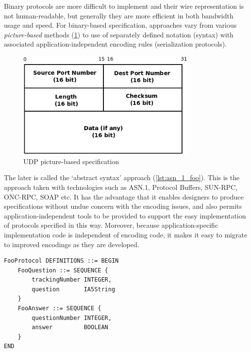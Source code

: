 \documentclass[times, utf8, diplomski]{fer}
\begin{document}
Binary protocols are more difficult to implement and their wire representation 
is not human-readable, but generally they are more efficient in both bandwidth 
usage and speed. For binary-based specification, approaches vary from various 
\emph{picture-based} methods (\ref{fig:udp_picture_spec}) to use of separately defined notation (syntax) with
associated application-independent encoding rules (serialization protocols).

\begin{figure}[htb]
\begin{center}
\leavevmode
\includegraphics[width=0.8\textwidth]{udp_picture_spec}
\end{center}
\caption{UDP picture-based specification}
\label{fig:udp_picture_spec}
\end{figure}

The later is called the `abstract syntax' approach (\ref{lst:asn_1_foo}). This is the approach taken 
with technologies such as ASN.1, Protocol Buffers, SUN-RPC, ONC-RPC, SOAP etc. 
It has the advantage that it enables designers to produce specifications without 
undue concern with the encoding issues, and also permits application-independent 
tools to be provided to support the easy implementation of protocols specified 
in this way. Moreover, because application-specific implementation code is 
independent of encoding code, it makes it easy to migrate to improved encodings 
as they are developed. 

\lstset{language=Prolog}
\lstset{basicstyle=\tiny}
\lstset{numbers=left, numberstyle=\tiny, stepnumber=1, numbersep=5pt}
\begin{lstlisting}[frame=tb]
FooProtocol DEFINITIONS ::= BEGIN
    FooQuestion ::= SEQUENCE {
        trackingNumber INTEGER,
        question       IA5String
    }
    FooAnswer ::= SEQUENCE {
        questionNumber INTEGER,
        answer         BOOLEAN
    }
END
\end{lstlisting}
\end{document}
